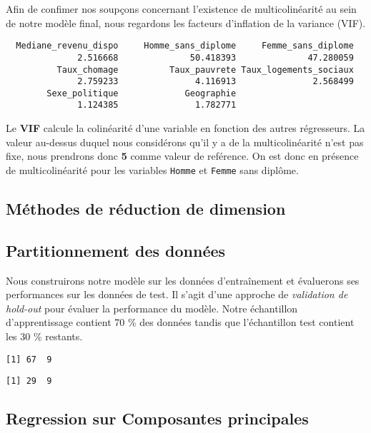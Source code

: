 \documentclass[
]{article}
\begin{document}
Afin de confimer nos soupçons concernant l'existence de multicolinéarité
au sein de notre modèle final, nous regardons les facteurs d'inflation
de la variance (VIF).

\begin{verbatim}
  Mediane_revenu_dispo     Homme_sans_diplome     Femme_sans_diplome 
              2.516668              50.418393              47.280059 
          Taux_chomage          Taux_pauvrete Taux_logements_sociaux 
              2.759233               4.116913               2.568499 
        Sexe_politique             Geographie 
              1.124385               1.782771 
\end{verbatim}

Le \textbf{VIF} calcule la colinéarité d'une variable en fonction des
autres régresseurs. La valeur au-dessus duquel nous considérons qu'il y
a de la multicolinéarité n'est pas fixe, nous prendrons donc \textbf{5}
comme valeur de reférence. On est donc en présence de multicolinéarité
pour les variables \texttt{Homme} et \texttt{Femme} sans diplôme.

\hypertarget{muxe9thodes-de-ruxe9duction-de-dimension}{%
\subsection{Méthodes de réduction de
dimension}\label{muxe9thodes-de-ruxe9duction-de-dimension}}

\hypertarget{partitionnement-des-donnuxe9es}{%
\subsection{Partitionnement des
données}\label{partitionnement-des-donnuxe9es}}

Nous construirons notre modèle sur les données d'entraînement et
évaluerons ses performances sur les données de test. Il s'agit d'une
approche de \emph{validation de hold-out} pour évaluer la performance du
modèle. Notre échantillon d'apprentissage contient 70 \% des données
tandis que l'échantillon test contient les 30 \% restants.

\begin{verbatim}
[1] 67  9
\end{verbatim}

\begin{verbatim}
[1] 29  9
\end{verbatim}

\hypertarget{regression-sur-composantes-principales}{%
\subsection{Regression sur Composantes
principales}\label{regression-sur-composantes-principales}}
\end{document}
